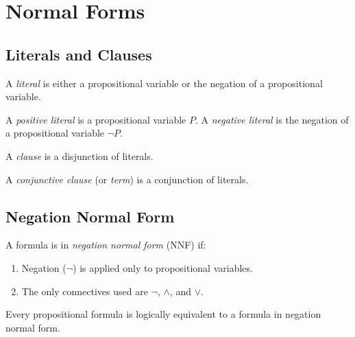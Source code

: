 
\section{Normal Forms}

\subsection{Literals and Clauses}

\begin{definition}[Literal]
A \emph{literal} is either a propositional variable or the negation of a
propositional variable.

A \emph{positive literal} is a propositional variable $P$.
A \emph{negative literal} is the negation of a propositional variable $\neg P$.
\end{definition}

\begin{definition}[Clause]
A \emph{clause} is a disjunction of literals.

A \emph{conjunctive clause} (or \emph{term}) is a conjunction of literals.
\end{definition}

\subsection{Negation Normal Form}

\begin{definition}
A formula is in \emph{negation normal form} (NNF) if:
\begin{enumerate}
  \item Negation ($\neg$) is applied only to propositional variables.
  \item The only connectives used are $\neg$, $\wedge$, and $\vee$.
\end{enumerate}
\end{definition}

\begin{theorem}
Every propositional formula is logically equivalent to a formula in negation
normal form.
\end{theorem}

